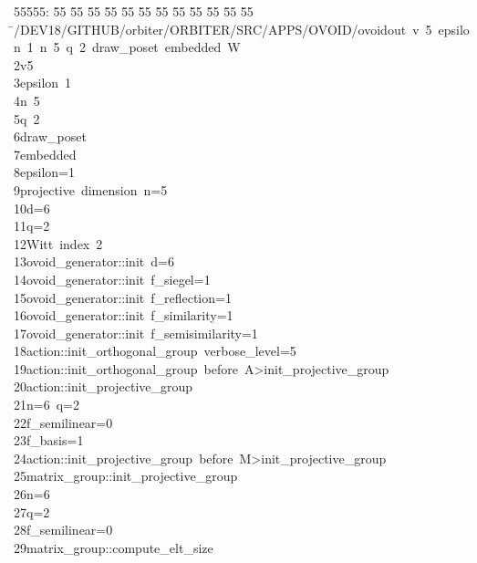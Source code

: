 %
%
\begin{tabbing}
55555: \= 55 \= 55 \= 55 \= 55 \= 55 \= 55 \= 55 \= 55 \= 55 \= 55 \= 55 \= 55 \= \>/DEV18/GITHUB/orbiter/ORBITER/SRC/APPS/OVOID/ovoidout\ v\ 5\ epsilon\ 1\ n\ 5\ q\ 2\ draw\_poset\ embedded\ W\\[0pt]
2\>v5\\[0pt]
3\>epsilon\ 1\\[0pt]
4\>n\ 5\\[0pt]
5\>q\ 2\\[0pt]
6\>draw\_poset\ \\[0pt]
7\>embedded\ \\[0pt]
8\>epsilon=1\\[0pt]
9\>projective\ dimension\ n=5\\[0pt]
10\>d=6\\[0pt]
11\>q=2\\[0pt]
12\>Witt\ index\ 2\\[0pt]
13\>ovoid\_generator::init\ d=6\\[0pt]
14\>ovoid\_generator::init\ f\_siegel=1\\[0pt]
15\>ovoid\_generator::init\ f\_reflection=1\\[0pt]
16\>ovoid\_generator::init\ f\_similarity=1\\[0pt]
17\>ovoid\_generator::init\ f\_semisimilarity=1\\[0pt]
18\>action::init\_orthogonal\_group\ verbose\_level=5\\[0pt]
19\>action::init\_orthogonal\_group\ before\ A>init\_projective\_group\\[0pt]
20\>action::init\_projective\_group\\[0pt]
21\>n=6\ q=2\\[0pt]
22\>f\_semilinear=0\\[0pt]
23\>f\_basis=1\\[0pt]
24\>action::init\_projective\_group\ before\ M>init\_projective\_group\\[0pt]
25\>matrix\_group::init\_projective\_group\\[0pt]
26\>n=6\\[0pt]
27\>q=2\\[0pt]
28\>f\_semilinear=0\\[0pt]
29\>matrix\_group::compute\_elt\_size\\[0pt]

\end{tabbing}
